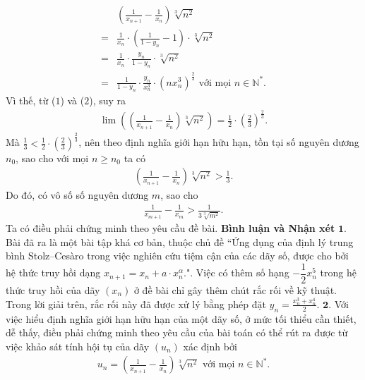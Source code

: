\begin{multicols}{2}
\begin{align*}
		&\left( {\frac{1}{{{x_{n + 1}}}} - \frac{1}{{{x_n}}}} \right)\sqrt[3]{{{n^2}}}\\
		= &\frac{1}{{{x_n}}} \cdot \left( {\frac{1}{{1 - {y_n}}} - 1} \right) \cdot \sqrt[3]{{{n^2}}} \\
		= &\frac{1}{{{x_n}}} \cdot \frac{{{y_n}}}{{1 - {y_n}}} \cdot \sqrt[3]{{{n^2}}} \\
		= &\frac{1}{{1 - {y_n}}} \cdot \frac{{{y_n}}}{{x_n^3}} \cdot {\left( {nx_n^3} \right)^{\frac{2}{3}}} \text{ với mọi } n\in \mathbb{N^*}.
	\end{align*}  
	Vì thế, từ ($1$) và ($2$), suy ra
	\begin{align*}
		\lim \left( {\left( {\frac{1}{{{x_{n + 1}}}} - \frac{1}{{{x_n}}}} \right)\sqrt[3]{{{n^2}}}} \right) = \frac{1}{2} \cdot {\left( {\frac{2}{3}} \right)^{\frac{2}{3}}}.
	\end{align*}
	Mà  $\frac{1}{3} < \frac{1}{2} \cdot {\left( {\frac{2}{3}} \right)^{\frac{2}{3}}}$, nên theo định nghĩa giới hạn hữu hạn, tồn tại số nguyên dương  $n_0$, sao cho với mọi $n \ge n_0$  ta có
	\begin{align*}
		\left( {\frac{1}{{{x_{n + 1}}}} - \frac{1}{{{x_n}}}} \right)\sqrt[3]{{{n^2}}} > \frac{1}{3}.
	\end{align*}
	Do đó, có vô số số nguyên dương $m$, sao cho
	\begin{align*}
		\frac{1}{{{x_{m + 1}}}} - \frac{1}{{{x_m}}} > \frac{1}{{3\sqrt[3]{{{m^2}}}}}.
	\end{align*}
	Ta có điều phải chứng minh theo yêu cầu đề bài.
	\vskip 0.05cm
	\textbf{\color{thachthuctoanhoc}Bình luận và Nhận xét}
	\vskip 0.05cm
	$\pmb{1.}$ Bài đã ra là một bài tập khá cơ bản, thuộc chủ đề ``Ứng dụng của định lý trung bình Stolz--Cesàro trong việc nghiên cứu tiệm cận của các dãy số, được cho bởi hệ thức truy hồi dạng ${x_{n + 1}} = {x_n} + a \cdot x_n^\alpha .$". Việc có thêm số hạng $-\dfrac{1}{2}x_n^5$ trong hệ thức truy hồi của dãy $(x_n)$  ở đề bài chỉ gây thêm chút rắc rối về kỹ thuật. Trong lời giải trên, rắc rối này đã được xử lý bằng phép đặt  ${y_n} = \frac{{x_n^3 + x_n^4}}{2}$.
	\vskip 0.05cm
	$\pmb{2.}$ Với việc hiểu định nghĩa giới hạn hữu hạn của một dãy số, ở mức tối thiểu cần thiết, dễ thấy, điều phải chứng minh theo yêu cầu của bài toán có thể rút ra được từ việc khảo sát tính hội tụ của dãy $(u_n)$  xác định bởi
	\begin{align*}
		{u_n} = \left( {\frac{1}{{{x_{n + 1}}}} - \frac{1}{{{x_n}}}} \right)\sqrt[3]{{{n^2}}} \text{ với mọi } n \in \mathbb{N^*}.
	\end{align*}

\end{multicols}

